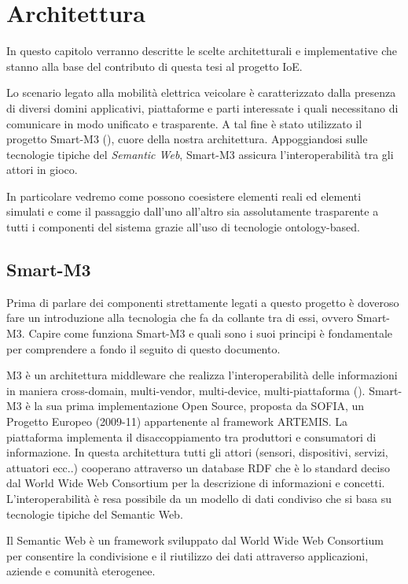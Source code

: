 \chapter{Architettura}

In questo capitolo verranno descritte le scelte architetturali e implementative che stanno alla base del contributo di questa tesi al progetto IoE. 

Lo scenario legato alla mobilità elettrica veicolare è caratterizzato dalla presenza di diversi domini applicativi, piattaforme e parti interessate i quali necessitano di comunicare in modo unificato e trasparente. A tal fine è stato utilizzato il progetto Smart-M3 (\cite{tullio2011}), cuore della nostra architettura. Appoggiandosi sulle tecnologie tipiche del \emph{Semantic Web}, Smart-M3 assicura l'interoperabilità tra gli attori in gioco. 

In particolare vedremo come possono coesistere elementi reali ed elementi simulati e come il passaggio dall'uno all'altro sia assolutamente trasparente a tutti i componenti del sistema grazie all'uso di tecnologie ontology-based.

\section{Smart-M3}\label{sec:smart-m3}

Prima di parlare dei componenti strettamente legati a questo progetto è doveroso fare un introduzione alla tecnologia che fa da collante tra di essi, ovvero Smart-M3. Capire come funziona Smart-M3 e quali sono i suoi principi è fondamentale per comprendere a fondo il seguito di questo documento.

M3 è un architettura middleware che realizza l'interoperabilità delle informazioni in maniera cross-domain, multi-vendor, multi-device, multi-piattaforma (\cite{smart2013}). Smart-M3 è la sua prima implementazione Open Source, proposta da SOFIA, un Progetto Europeo (2009-11) appartenente al framework ARTEMIS. 
La piattaforma implementa il disaccoppiamento tra produttori e consumatori di informazione. In questa architettura tutti gli attori (sensori, dispositivi, servizi, attuatori ecc..) cooperano attraverso un database RDF che è lo standard deciso dal World Wide Web Consortium per la descrizione di informazioni e concetti. L'interoperabilità è resa possibile da un modello di dati condiviso che si basa su tecnologie tipiche del Semantic Web.

Il Semantic Web è un framework sviluppato dal World Wide Web Consortium per consentire la condivisione e il riutilizzo dei dati attraverso  applicazioni, aziende e comunità eterogenee.


